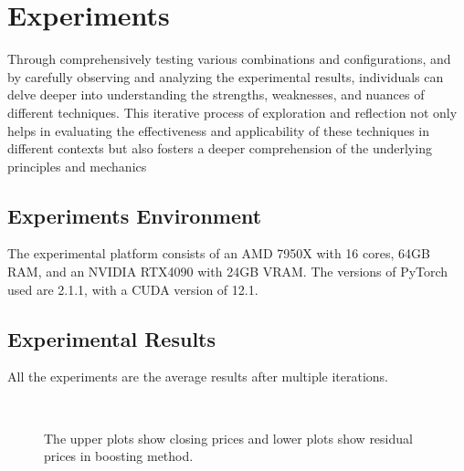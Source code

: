 \documentclass[10pt,twocolumn,letterpaper]{article}
\begin{document}
\section{Experiments}
\label{sec:exper}
Through comprehensively testing various combinations and configurations, and by carefully observing and analyzing the experimental results, individuals can delve deeper into understanding the strengths, weaknesses, and nuances of different techniques. This iterative process of exploration and reflection not only helps in evaluating the effectiveness and applicability of these techniques in different contexts but also fosters a deeper comprehension of the underlying principles and mechanics
\subsection{Experiments Environment}
\label{exper:env}
The experimental platform consists of an AMD 7950X with 16 cores, 64GB RAM, and an NVIDIA RTX4090 with 24GB VRAM. The versions of PyTorch used are 2.1.1, with a CUDA version of 12.1.
\subsection{Experimental Results}
\label{exper:env_res}
All the experiments are the average results after multiple iterations.
\begin{figure}[h]
	\centering
	 \\
	\caption{The upper plots show closing prices and lower plots show residual prices in boosting method.}
	\label{fig:bst_res}
\end{figure}
\end{document}
